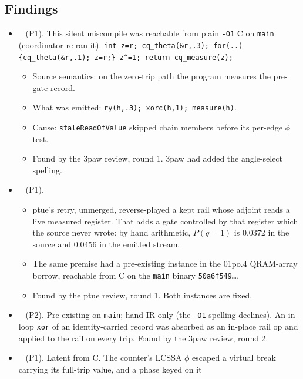 \subsection*{Findings}
\begin{itemize}
  \item \fconfirmed\  (P1). This silent miscompile was
  reachable from plain \texttt{-O1} C on \texttt{main}  (coordinator
  re-ran it). \texttt{int z=r; cq\_theta(\&r,.3); for(..)\{cq\_theta(\&r,.1); z=r;\}
  z\^{}=1; return cq\_measure(z);}
  \begin{itemize}
    \item Source semantics: on the zero-trip path the program measures the pre-gate record.
    \item What was emitted: \texttt{ry(h,.3); xorc(h,1); measure(h)}.
    \item Cause: \texttt{staleReadOfValue} skipped chain members before its per-edge
    $\phi$ test.
    \item Found by the 3paw review, round 1. 3paw had added the angle-select spelling.
  \end{itemize}
  \item \fconfirmed\  (P1).
  \begin{itemize}
    \item ptue's retry, unmerged, reverse-played a kept rail whose adjoint reads a live
    measured register. That adds a gate controlled by that register which the source never
    wrote: by hand arithmetic, $P(q{=}1)$ is 0.0372 in the source and 0.0456 in the emitted
    stream.
    \item The same premise had a pre-existing instance in the 01po.4 QRAM-array borrow,
    reachable from C on the \texttt{main} binary \texttt{50a6f549\ldots}.
    \item Found by the ptue review, round 1. Both instances are fixed.
  \end{itemize}
  \item \fconfirmed\  (P2). Pre-existing on \texttt{main}; hand
  IR only (the \texttt{-O1} spelling declines). An in-loop \texttt{xor} of an identity-carried
  record was absorbed as an in-place rail op and applied to the rail on every trip. Found
  by the 3paw review, round 2.
  \item \fconfirmed\  (P1). Latent from C. The counter's
  LCSSA $\phi$ escaped a virtual break carrying its full-trip value, and a phase keyed on it

\end{itemize}
